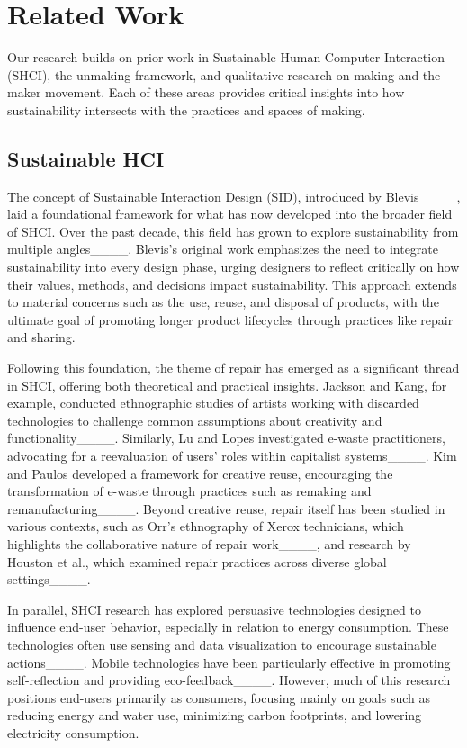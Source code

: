 \section{Related Work}
Our research builds on prior work in Sustainable Human-Computer Interaction (SHCI), the unmaking framework, and qualitative research on making and the maker movement. Each of these areas provides critical insights into how sustainability intersects with the practices and spaces of making.

\subsection{Sustainable HCI}

The concept of Sustainable Interaction Design (SID), introduced by Blevis____, laid a foundational framework for what has now developed into the broader field of SHCI. 
Over the past decade, this field has grown to explore sustainability from multiple angles____. Blevis’s original work emphasizes the need to integrate sustainability into every design phase, urging designers to reflect critically on how their values, methods, and decisions impact sustainability. 
This approach extends to material concerns such as the use, reuse, and disposal of products, with the ultimate goal of promoting longer product lifecycles through practices like repair and sharing.

Following this foundation, the theme of repair has emerged as a significant thread in SHCI, offering both theoretical and practical insights. Jackson and Kang, for example, conducted ethnographic studies of artists working with discarded technologies to challenge common assumptions about creativity and functionality____. Similarly, Lu and Lopes investigated e-waste practitioners, advocating for a reevaluation of users’ roles within capitalist systems____. 
Kim and Paulos developed a framework for creative reuse, encouraging the transformation of e-waste through practices such as remaking and remanufacturing____. 
Beyond creative reuse, repair itself has been studied in various contexts, such as Orr's ethnography of Xerox technicians, which highlights the collaborative nature of repair work____, and research by Houston et al., which examined repair practices across diverse global settings____.


In parallel, SHCI research has explored persuasive technologies designed to influence end-user behavior, especially in relation to energy consumption. 
These technologies often use sensing and data visualization to encourage sustainable actions____. 
Mobile technologies have been particularly effective in promoting self-reflection and providing eco-feedback____. 
However, much of this research positions end-users primarily as consumers, focusing mainly on goals such as reducing energy and water use, minimizing carbon footprints, and lowering electricity consumption.

